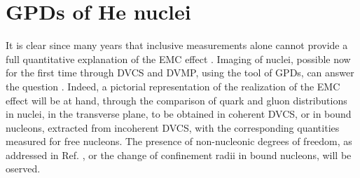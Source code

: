 \section{GPDs of He nuclei}

It is clear since many years that inclusive measurements alone cannot
provide a 
full quantitative explanation of the EMC
effect \cite{Aubert:1983xm}.
Imaging of nuclei, possible now for the first time
through DVCS and DVMP, using the tool of GPDs, can
answer the question \cite{Dupre:2015jha}. Indeed,
a pictorial representation of the realization of the
EMC effect will be at hand, through the comparison of 
quark and gluon distributions 
in nuclei, in the transverse plane, to be obtained in coherent DVCS, or 
in bound nucleons, extracted from incoherent DVCS, with the corresponding
quantities measured for free nucleons.
The presence of non-nucleonic degrees of freedom, 
as addressed in Ref. \cite{primo},
or the 
change of confinement radii in bound nucleons, will be oserved. 

